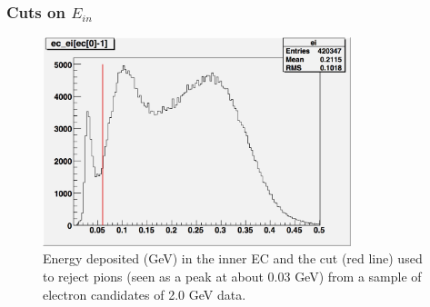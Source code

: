 





\subsubsection{Cuts on $E_{in}$}
\begin{figure}[h] %
\centering
\leavevmode \includegraphics[width=0.8\textwidth]{figuresEG4/FigCuts/ec_eiCutFrmRtPrmtClasEb2.png}  %
\caption[EC inner energy cut (2.0 GeV)]{Energy deposited (GeV) in the inner EC and the cut (red line) used to reject pions (seen as a peak at about 0.03 GeV) from a sample of electron candidates of 2.0 GeV data.}
\label{ecInExp1}
\end{figure}


